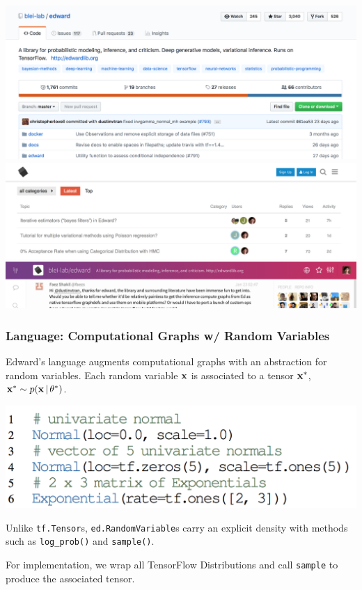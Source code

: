\documentclass[10pt,
               xcolor={usenames,dvipsnames},
               hyperref={colorlinks,linktoc=all,citecolor=Plum,linkcolor=MidnightBlue,urlcolor=MidnightBlue},noamssymb]{beamer}
\begin{document}
\begin{frame}
\begin{center}
\vspace{-2.5ex}
\includegraphics[width=1.0\textwidth]{img/github.png}
\\[-1.5ex]
\includegraphics[width=1.0\textwidth]{img/forum.png}
\\[-3ex]
\includegraphics[width=1.0\textwidth]{img/gitter.png}
\\[2ex]
\end{center}
\end{frame}

\begin{frame}
\frametitle{Language: Computational Graphs w/ Random Variables}
Edward's language augments computational graphs with an abstraction
for random variables.
Each random variable $\boldsymbol{\mathbf{x}}$ is associated to a tensor $\boldsymbol{\mathbf{x}}^*$,
$\boldsymbol{\mathbf{x}}^*\sim p(\boldsymbol{\mathbf{x}}\,|\,\theta^*)$.

\vspace{-1.0ex}
\includegraphics[height=0.20\textwidth]{img/random_variables.png}

Unlike \texttt{tf.Tensor}s, \texttt{ed.RandomVariable}s
carry an explicit density with methods
such as \texttt{log\_prob()} and \texttt{sample()}.

For implementation, we wrap all TensorFlow Distributions and call
\texttt{sample} to produce the associated tensor.
\end{frame}
\end{document}
